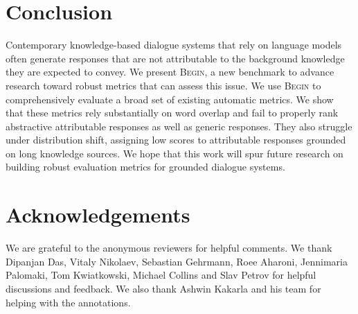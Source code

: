\section{Conclusion}
Contemporary knowledge-based dialogue systems that rely on language models often generate responses that are not attributable to the background knowledge they are expected to convey. We present \textsc{Begin}, a new benchmark to advance research toward robust metrics that can assess this issue. 
We use \textsc{Begin} to comprehensively evaluate a broad set of existing automatic metrics. We show that these metrics rely substantially on word overlap and fail to properly rank abstractive attributable responses as well as generic responses. They also struggle under distribution shift, assigning low scores to attributable responses grounded on long knowledge sources. 
We hope that this work will spur future research on building robust evaluation metrics for grounded dialogue systems.

\section*{Acknowledgements}
We are grateful to the anonymous
reviewers for helpful comments.
We thank Dipanjan Das, Vitaly Nikolaev, Sebastian Gehrmann,  Roee Aharoni, Jennimaria Palomaki,  Tom Kwiatkowski, Michael Collins and Slav Petrov for helpful discussions and feedback. We also thank Ashwin Kakarla and his team for
helping with the annotations.
